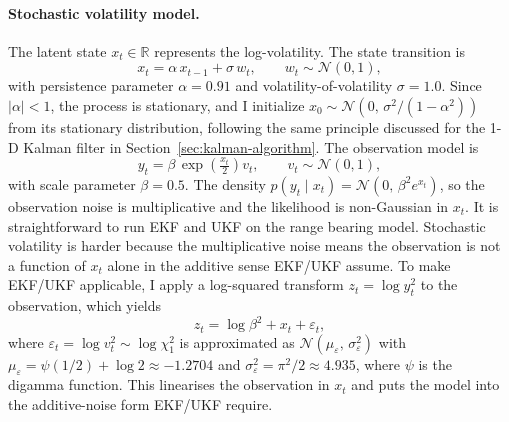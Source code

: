 \documentclass{article}
\begin{document}
\paragraph{Stochastic volatility model.}
The latent state $x_t \in \mathbb{R}$ represents the log-volatility. The state transition is
\begin{equation}
    x_t = \alpha\, x_{t-1} + \sigma\, w_t, \qquad w_t \sim \mathcal{N}(0, 1),
\end{equation}
with persistence parameter $\alpha = 0.91$ and volatility-of-volatility $\sigma = 1.0$. Since $|\alpha| < 1$, the process is stationary, and I initialize $x_0 \sim \mathcal{N}\!\left(0,\, \sigma^2/(1-\alpha^2)\right)$ from its stationary distribution, following the same principle discussed for the 1-D Kalman filter in Section~\ref{sec:kalman-algorithm}. The observation model is
\begin{equation}
    y_t = \beta\,\exp\!\left(\tfrac{x_t}{2}\right) v_t, \qquad v_t \sim \mathcal{N}(0, 1),
\end{equation}
with scale parameter $\beta = 0.5$. The density $p(y_t \mid x_t) = \mathcal{N}(0,\, \beta^2 e^{x_t})$, so the observation noise is multiplicative and the likelihood is non-Gaussian in $x_t$. It is straightforward to run EKF and UKF on the range bearing model. Stochastic volatility is harder because the multiplicative noise means the observation is not a function of $x_t$ alone in the additive sense EKF/UKF assume. To make EKF/UKF applicable, I apply a log-squared transform $z_t = \log y_t^2$ to the observation, which yields
\begin{equation}
    z_t = \log\beta^2 + x_t + \varepsilon_t,
\end{equation}
where $\varepsilon_t = \log v_t^2 \sim \log\chi^2_1$ is approximated as $\mathcal{N}(\mu_\varepsilon,\, \sigma_\varepsilon^2)$ with $\mu_\varepsilon = \psi(1/2) + \log 2 \approx -1.2704$ and $\sigma_\varepsilon^2 = \pi^2/2 \approx 4.935$, where $\psi$ is the digamma function. This linearises the observation in $x_t$ and puts the model into the additive-noise form EKF/UKF require.
\end{document}
